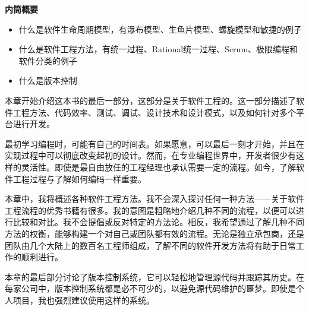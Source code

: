 \noindent
\textbf{内筒概要}

\begin{itemize}
\item
什么是软件生命周期模型，有瀑布模型、生鱼片模型、螺旋模型和敏捷的例子

\item
什么是软件工程方法，有统一过程、Rational统一过程、Scrum、极限编程和软件分类的例子

\item
什么是版本控制
\end{itemize}

本章开始介绍这本书的最后一部分，这部分是关于软件工程的。这一部分描述了软件工程方法、代码效率、测试、调试、设计技术和设计模式，以及如何针对多个平台进行开发。

最初学习编程时，可能有自己的时间表。如果愿意，可以最后一刻才开始，并且在实现过程中可以彻底改变起初的设计。然而，在专业编程世界中，开发者很少有这样的灵活性。即使是最自由放任的工程经理也承认需要一定的流程。如今，了解软件工程过程与了解如何编码一样重要。

本章中，我将概述各种软件工程方法。我不会深入探讨任何一种方法——关于软件工程流程的优秀书籍有很多。我的意图是粗略地介绍几种不同的流程，以便可以进行比较和对比。我不会提倡或反对特定的方法论。相反，我希望通过了解几种不同方法的权衡，能够构建一个对自己或团队都有效的流程。无论是独立承包商，还是团队由几个大陆上的数百名工程师组成，了解不同的软件开发方法将有助于日常工作的顺利进行。

本章的最后部分讨论了版本控制系统，它可以轻松地管理源代码并跟踪其历史。在每家公司中，版本控制系统都是必不可少的，以避免源代码维护的噩梦。即使是个人项目，我也强烈建议使用这样的系统。








